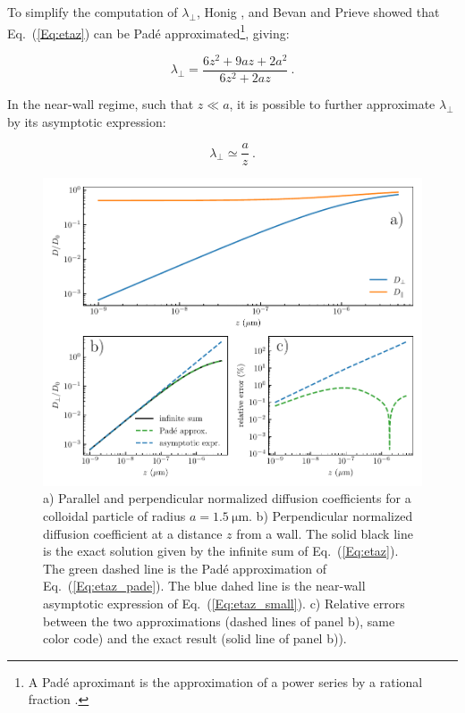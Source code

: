 To simplify the computation of $\lambda_\bot$, Honig \cite{honig_effect_1971}, and Bevan and Prieve \cite{bevan_hindered_2000} showed that Eq.~(\ref{Eq:etaz}) can be Padé approximated\footnote{A Padé aproximant is the approximation of a power series by a rational fraction \cite{baker_pade_1996}.}, giving:

\begin{equation}
	\lambda_\bot =  \frac{6z^2 + 9az + 2a^2}{6z^2 + 2az}~.
	\label{Eq:etaz_pade}
\end{equation}

In the near-wall regime, such that $z \ll a$, it is possible to further approximate $\lambda_\bot$ by its asymptotic expression:

\begin{equation}
	\lambda_\bot \simeq \frac{a}{z} ~.
	\label{Eq:etaz_small}
\end{equation}


\begin{figure}[H]
	\centering
	\includegraphics{02_body/chapter3/images/theory_lambda/hindered_diffusion.pdf}
	\caption{a)  Parallel and perpendicular normalized diffusion coefficients for a colloidal particle of radius $a = 1.5 ~ \mathrm{\mu m}$. b) Perpendicular normalized diffusion coefficient at a distance $z$ from a wall. The solid black line is the exact solution given by the infinite sum of Eq.~(\ref{Eq:etaz}). The green dashed line is the Padé approximation of Eq.~(\ref{Eq:etaz_pade}). The blue dahed line is the near-wall asymptotic expression of Eq.~(\ref{Eq:etaz_small}). c) Relative errors between the two approximations (dashed lines of panel b), same color code) and the exact result (solid line of panel b)).\href{https://github.com/eXpensia/Confined-Brownian-Motion/blob/main/02_body/chapter3/images/theory_lambda/Hindered_diffusion.ipynb}{\faGithub}}
	\label{fig.etaz}
\end{figure}


